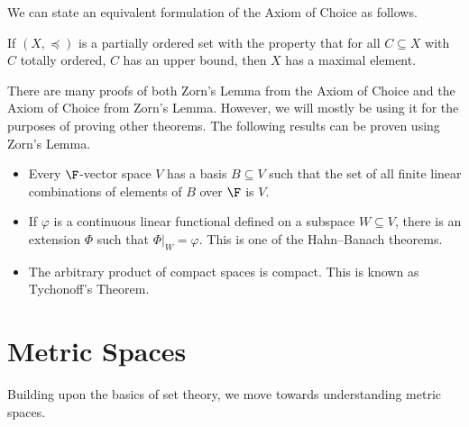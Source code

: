 We can state an equivalent formulation of the Axiom of Choice as follows.
\begin{theorem}
  If $\left(X,\preceq\right)$ is a partially ordered set with the property that for all $C\subseteq X$ with $C$ totally ordered, $C$ has an upper bound, then $X$ has a maximal element.
\end{theorem}
There are many proofs of both Zorn's Lemma from the Axiom of Choice and the Axiom of Choice from Zorn's Lemma. However, we will mostly be using it for the purposes of proving other theorems. The following results can be proven using Zorn's Lemma.
\begin{example}\hfill
  \begin{itemize}
    \item Every $\F$-vector space $V$ has a basis $B\subseteq V$ such that the set of all finite linear combinations of elements of $B$ over $\F$ is $V$.
    \item If $\varphi$ is a continuous linear functional defined on a subspace $W\subseteq V$, there is an extension $\Phi$ such that $\Phi|_{W} = \varphi$. This is one of the Hahn--Banach theorems. %
    \item The arbitrary product of compact spaces is compact. This is known as Tychonoff's Theorem. %
  \end{itemize}
\end{example}
\section{Metric Spaces}%
Building upon the basics of set theory, we move towards understanding metric spaces.
